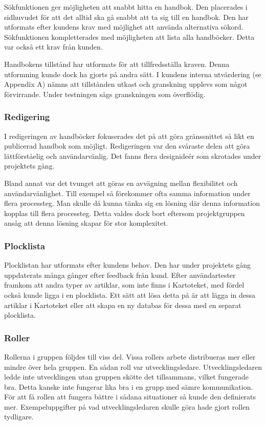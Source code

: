 \documentclass{article}
\begin{document}
Sökfunktionen ger möjligheten att snabbt hitta en handbok. Den placerades i sidhuvudet för att det alltid ska gå snabbt att ta sig till en handbok. Den har utformats efter kundens krav med möjlighet att använda alternativa sökord.
Sökfunktionen kompletterades med möjligheten att lista alla handböcker. Detta var också ett krav från kunden. 

Handbokens tillstånd har utformats för att tillfredsställa kraven. Denna utformning kunde dock ha gjorts på andra sätt. I kundens interna utvärdering (se Appendix A) nämns att tillstånden utkast och granskning upplevs som något förvirrande. Under testningen sågs granskningen som överflödig.
\subsubsection{Redigering}
I redigeringen av handböcker fokuserades det på att göra gränssnittet så likt en publicerad handbok som möjligt. Redigeringen var den svåraste delen att göra lättförståelig och användarvänlig. Det fanns flera designideér som skrotades under projektets gång.

Bland annat var det tvunget att göras en avvägning mellan flexibilitet och användar\-vänlighet.
Till exempel så förekommer ofta samma information under flera processteg. Man skulle då kunna tänka sig en lösning där denna information kopplas till flera processteg. Detta valdes dock bort eftersom projektgruppen ansåg att denna lösning skapar för stor komplexitet.

\subsubsection{Plocklista}
Plocklistan har utformats efter kundens behov. Den har under projektets gång uppdaterats många gånger efter feedback från kund. Efter användartester framkom att andra typer av artiklar, som inte finns i Kartoteket, med fördel också kunde ligga i en plocklista. Ett sätt att lösa detta på är att lägga in dessa artiklar i Kartoteket eller att skapa en ny databas för dessa med en separat plocklista.

\subsubsection{Roller}
Rollerna i gruppen följdes till viss del. Vissa rollers arbete distribueras mer eller mindre över hela gruppen. En sådan roll var utvecklingsledare. Utvecklingsledaren ledde inte utvecklingen utan gruppen skötte det tillsammans, vilket fungerade bra. Detta kanske inte fungerar lika bra i en grupp med sämre kommunikation. För att få rollen att fungera bättre i sådana situationer så kunde den definierats mer. Exempeluppgifter på vad utvecklingsledaren skulle göra hade gjort rollen tydligare. 
\end{document}
